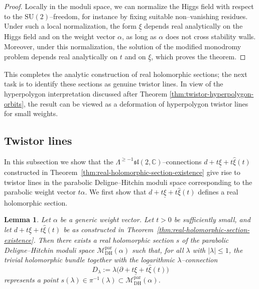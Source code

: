 \documentclass[12pt,a4paper]{amsart}
\newtheorem{lemma}[theorem]{Lemma}
\theoremstyle{definition}
\theoremstyle{remark}
\newcommand{\C}{\mathbb C}
\begin{document}
\begin{proof}
Locally in the moduli space, we can normalize the Higgs field with respect to the
$\mathrm{SU}(2)$--freedom, for instance by fixing suitable non--vanishing residues.
Under such a local normalization, the form $\underline\xi$ depends real analytically
on the Higgs field and on the weight vector $\alpha$, as long as $\alpha$ does not
cross stability walls.
Moreover, under this normalization, the solution of the modified monodromy problem
depends real analytically on $t$ and on $\underline\xi$, which proves the theorem.
\end{proof}

This completes the analytic construction of real holomorphic sections; the next task is to identify these sections as genuine twistor lines.
In view of the hyperpolygon interpretation discussed after Theorem \ref{thm:twistor-hyperpolygon-orbits}, the result can be viewed as a deformation of hyperpolygon twistor lines for small weights.


\subsection{Twistor lines}\label{sec:constwistor}
In this subsection we show that the $\Lambda^{\geq-1}\mathfrak{sl}(2,\C)$--connections
$d+t\underline\xi+t\hat\xi(t)$ constructed in
Theorem~\ref{thm:real-holomorphic-section-existence}
give rise to twistor lines in the parabolic Deligne--Hitchin moduli space
corresponding to the parabolic weight vector $t\alpha$.
We first show that $d+t\underline\xi+t\hat\xi(t)$ defines a real holomorphic section.

\begin{lemma}\label{lem:realholosec}
Let $\alpha$ be a generic weight vector.
Let $t>0$ be sufficiently small, and let $d+t\underline\xi+t\hat\xi(t)$ be as constructed
in Theorem~\ref{thm:real-holomorphic-section-existence}.
Then there exists a real holomorphic section $s$ of the parabolic Deligne--Hitchin
moduli space $\mathcal M_{\mathrm{DH}}^{\mathrm{par}}(\alpha)$ such that, for all
$\lambda$ with $|\lambda|\leq1$, the trivial holomorphic bundle together with the
logarithmic $\lambda$--connection
\[
D_\lambda:=\lambda\bigl(\partial+t\underline\xi+t\hat\xi(t)\bigr)
\]
represents a point
$s(\lambda)\in \pi^{-1}(\lambda)\subset\mathcal M_{\mathrm{DH}}^{\mathrm{par}}(\alpha)$.
\end{lemma}
\end{document}
